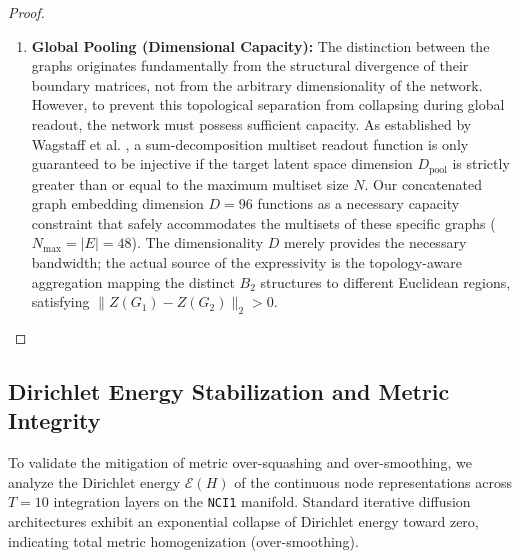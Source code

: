 \documentclass[11pt, letterpaper]{article}
\begin{document}
\begin{proof}
\begin{enumerate}
    \item \textbf{Global Pooling (Dimensional Capacity):} The distinction between the graphs originates fundamentally from the structural divergence of their boundary matrices, not from the arbitrary dimensionality of the network. However, to prevent this topological separation from collapsing during global readout, the network must possess sufficient capacity. As established by Wagstaff et al. \cite{wagstaff_sets}, a sum-decomposition multiset readout function is only guaranteed to be injective if the target latent space dimension $D_{\text{pool}}$ is strictly greater than or equal to the maximum multiset size $N$. Our concatenated graph embedding dimension $D = 96$ functions as a necessary capacity constraint that safely accommodates the multisets of these specific graphs ($N_{\max} = |E| = 48$). The dimensionality $D$ merely provides the necessary bandwidth; the actual source of the expressivity is the topology-aware aggregation mapping the distinct $B_2$ structures to different Euclidean regions, satisfying $\|Z(G_1) - Z(G_2)\|_2 > 0$. \qedhere
\end{enumerate}
\end{proof}

\begin{table}[htbp]
\centering
\caption{Isomorphism Resolution on Strongly Regular Graphs (16, 6, 2, 2) via Betti Numbers}
\vspace{0.2cm}
\end{table}

\subsection{Dirichlet Energy Stabilization and Metric Integrity}
To validate the mitigation of metric over-squashing and over-smoothing, we analyze the Dirichlet energy $\mathcal{E}(H)$ of the continuous node representations across $T=10$ integration layers on the \texttt{NCI1} manifold. Standard iterative diffusion architectures exhibit an exponential collapse of Dirichlet energy toward zero, indicating total metric homogenization (over-smoothing).
\end{document}
